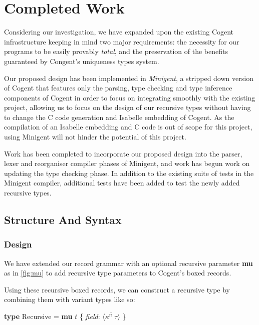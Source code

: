 \chapter{Completed Work}\label{ch:style}

Considering our investigation, we have expanded upon the existing Cogent infrastructure keeping in mind
two major requirements: the necessity for our programs to be easily provably \textit{total},
and the preservation of the benefits guaranteed by Congent's uniqueness types system.

Our proposed design has been implemented in \textit{Minigent}, a stripped down version of Cogent that
features only the parsing, type checking and type inference components of Cogent in order to
focus on integrating smoothly with the existing project, allowing us to focus on the design
of our recursive types without having to change the C code generation and Isabelle embedding of Cogent.
As the compilation of an Isabelle embedding and C code is out of scope for this project,
using Minigent will not hinder the potential of this project.

Work has been completed to incorporate our proposed design into the parser, lexer and reorganiser compiler phases of
Minigent, and work has begun work on updating the type checking phase.
In addition to the existing suite of tests in the Minigent compiler, additional tests have 
been added to test the newly added recursive types.

\section{Structure And Syntax}

\subsection{Design}

We have extended our record grammar with an optional recursive parameter \textbf{mu} as in \autoref{fig:mu} to add 
recursive type parameters to Cogent's boxed records.

Using these recursive boxed records, we can construct a recursive type by combining them with variant types like so:

\begin{center}
    \textbf{type} Recursive = \textbf{mu} $t$ \{ \textit{field}: $\langle \overline{\kappa^n\; \tau} \rangle$ \}
\end{center}

